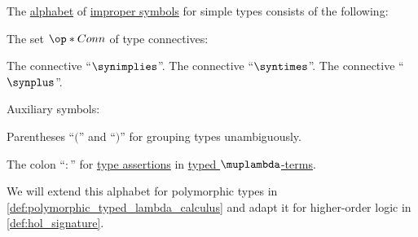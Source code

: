 \begin{definition}\label{def:simple_type_alphabet}\mimprovised
  The \hyperref[def:formal_language/alphabet]{alphabet} of \hyperref[con:improper_symbol]{improper symbols} for simple types consists of the following:

  \begin{thmenum}
     The set \( \op*{Conn} \) of type connectives:
    \begin{thmenum}
       The  connective \enquote{\( \synimplies \)}.
       The  connective \enquote{\( \syntimes \)}.
       The  connective \enquote{\( \synplus \)}.
    \end{thmenum}

     Auxiliary symbols:
    \begin{thmenum}
       Parentheses \enquote{\( ( \)} and \enquote{\( ) \)} for grouping types unambiguously.

       The colon \enquote{\( : \)} for \hyperref[def:type_assertion]{type assertions} in \hyperref[def:typed_lambda_term]{typed \( \muplambda \)-terms}.
    \end{thmenum}
  \end{thmenum}
\end{definition}
\begin{comments}
  \item We will extend this alphabet for polymorphic types in \cref{def:polymorphic_typed_lambda_calculus} and adapt it for higher-order logic in \cref{def:hol_signature}.
\end{comments}

